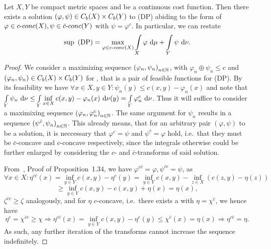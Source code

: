 \begin{theorem}\label{DPSolExist}
	Let $X, Y$ be compact metric spaces and  be a continuous cost function. Then there exists a solution $(\varphi,\psi) \in \CF[b]{X} \times \CF[b]{Y}$ to (DP) abiding to the form of $\varphi \in \CConc{X}, \psi \in \CBConc{Y}$ with $\psi = \varphi^c$. In particular, we can restate
	\[ \sup \text{\normalfont\ (DP)} = \max\limits_{\varphi \in \CConc{X}} \int\limits_X \varphi~\D + \int\limits_Y \psi~\D[\nu]. \]
\end{theorem}

\begin{proof}
	We consider a maximizing sequence ${(\varphi_n, \psi_n)}_{\NinN}$, with $\varphi_n \oplus \psi_n \le c$ and $(\varphi_n, \psi_n) \in \CF[b]{X} \times \CF[b]{Y}$ for \NinN{}, that is a pair of feasible functions for (DP). By its feasibility we have $\forall x \in X, y \in Y: \psi_n(y) \le c(x, y) - \varphi_n(x)$ and note that $\int\limits_Y \psi_n~\D[\nu] \le \int\limits_Y \inf\limits_{x \in X} c(x, y) - \varphi_n(x)~\Dx[y]{\nu} = \int\limits_Y \varphi_n^c~\D[\nu]$. Thus it will suffice to consider a maximixing sequence ${(\varphi_n, \varphi_n^c)}_{\NinN}$. The same argument for $\psi_n$ results in a sequence ${(\psi^{\bar{c}}, \psi_n)}_{\NinN}$. This already means, that for an arbitrary pair $(\varphi, \psi)$ to be a solution, it is neccessary that $\varphi^c = \psi$ and $\psi^{\bar{c}} = \varphi$ hold, i.e.~that they must be $\bar{c}$-concave and $c$-concave respectively, since the integrals otherwise could be further enlarged by considering the $c$- and $\bar{c}$-transforms of said solution.

	From~\cite{San2015}, Proof of Proposition~1.34, we have $\varphi^{c\bar{c}} = \varphi, \psi^{\bar{c}c} = \psi$, as
	\[ \forall x \in X: \eta^{c\bar{c}}(x) = \inf\limits_{y \in Y} c(x, y) - \eta^c(y) = \inf\limits_{y \in Y} c(x, y) - \inf\limits_{z \in X} (c(z, y) - \eta(z)) \]
	\[ \ge \inf\limits_{y \in Y} c(x, y) - c(x, y) + \eta(x) = \eta(x), \]
	$\zeta^{\bar{c}c} \ge \zeta$ analogously, and for $\eta$ $c$-concave, i.e.~there exists a  with $\eta = \chi^{\bar{c}}$, we hence have
	\[ \eta^c = \chi^{\bar{c}c} \ge \chi \Rightarrow \eta^{c\bar{c}}(x) = \inf\limits_{y \in Y} c(x, y) - \eta^c(y) \le \chi^{\bar{c}}(x) = \eta(x) \Rightarrow \eta^{c\bar{c}} = \eta. \]
	As such, any further iteration of the transforms cannot increase the sequence indefinitely.


\end{proof}
